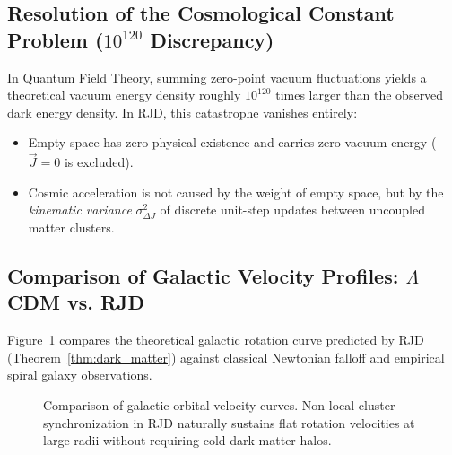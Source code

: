 \documentclass[11pt,a4paper]{article}
\theoremstyle{plain}
\theoremstyle{definition}
\theoremstyle{remark}
\newcommand{\Jerk}{\vec{J}}
\begin{document}
\subsection{Resolution of the Cosmological Constant Problem ($10^{120}$ Discrepancy)}
In Quantum Field Theory, summing zero-point vacuum fluctuations yields a theoretical vacuum energy density roughly $10^{120}$ times larger than the observed dark energy density. In RJD, this catastrophe vanishes entirely:
\begin{itemize}
\item Empty space has zero physical existence and carries zero vacuum energy ($\Jerk = 0$ is excluded).
\item Cosmic acceleration is not caused by the weight of empty space, but by the \emph{kinematic variance} $\sigma_{\Delta J}^2$ of discrete unit-step updates between uncoupled matter clusters.
\end{itemize}
\subsection{Comparison of Galactic Velocity Profiles: $\Lambda$CDM vs. RJD}
Figure~\ref{fig:rotation_curve} compares the theoretical galactic rotation curve predicted by RJD (Theorem~\ref{thm:dark_matter}) against classical Newtonian falloff and empirical spiral galaxy observations.
\begin{figure}[htbp]
\centering
{}
\caption{Comparison of galactic orbital velocity curves. Non-local cluster synchronization in RJD naturally sustains flat rotation velocities at large radii without requiring cold dark matter halos.}
\label{fig:rotation_curve}
\end{figure}
\end{document}
